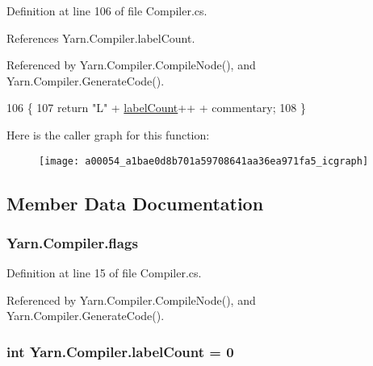 Definition at line 106 of file Compiler.\-cs.



References Yarn.\-Compiler.\-label\-Count.



Referenced by Yarn.\-Compiler.\-Compile\-Node(), and Yarn.\-Compiler.\-Generate\-Code().


\begin{DoxyCode}
106                                                        \{
107             \textcolor{keywordflow}{return} \textcolor{stringliteral}{"L"} + \hyperlink{a00054_a87758397eba2e84cda8e0d6c40656f3f}{labelCount}++ + commentary;
108         \}
\end{DoxyCode}


Here is the caller graph for this function\-:
\nopagebreak
\begin{figure}[H]
\begin{center}
\leavevmode
\texttt{[image: a00054\_a1bae0d8b701a59708641aa36ea971fa5\_icgraph]}
\end{center}
\end{figure}




\subsection{Member Data Documentation}
\hypertarget{a00054_a541022d89bcf9bc8f794eb6d6b438d08}{
\subsubsection[{flags}]{ Yarn.\-Compiler.\-flags\hspace{0.3cm}{\ttfamily [private]}}}\label{a00054_a541022d89bcf9bc8f794eb6d6b438d08}


Definition at line 15 of file Compiler.\-cs.



Referenced by Yarn.\-Compiler.\-Compile\-Node(), and Yarn.\-Compiler.\-Generate\-Code().

\hypertarget{a00054_a87758397eba2e84cda8e0d6c40656f3f}{
\subsubsection[{label\-Count}]{\setlength{\rightskip}{0pt plus 5cm}int Yarn.\-Compiler.\-label\-Count = 0\hspace{0.3cm}{\ttfamily [private]}}}\label{a00054_a87758397eba2e84cda8e0d6c40656f3f}


